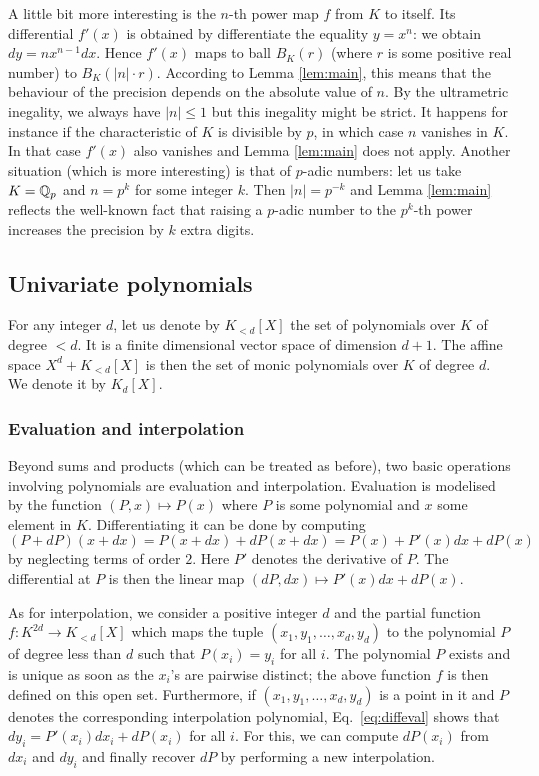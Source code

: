 \documentclass{lms}
\begin{document}
A little bit more interesting is the $n$-th power map $f$ from $K$ to 
itself. Its differential $f'(x)$ is obtained by differentiate the 
equality $y = x^n$: we obtain $dy = n x^{n-1} dx$.
Hence $f'(x)$ maps to ball $B_K(r)$ (where $r$ is some positive real 
number) to $B_K(|n|{\cdot} r)$. According to Lemma \ref{lem:main}, this 
means that the behaviour of the precision depends on the absolute value 
of $n$. By the ultrametric inegality, we always have $|n| \leq 1$ but 
this inegality might be strict. It happens for instance if the 
characteristic of $K$ is divisible by $p$, in which case $n$ vanishes in 
$K$. In that case $f'(x)$ also vanishes and Lemma \ref{lem:main} does 
not apply. 
Another situation (which is more interesting) is that of $p$-adic 
numbers: let us take $K = \mathbb Q_p$ and $n = p^k$ for some integer $k$. Then
$|n| = p^{-k}$ and Lemma \ref{lem:main} reflects the well-known fact that
raising a $p$-adic number to the $p^k$-th power increases the precision 
by $k$ extra digits.

\subsection{Univariate polynomials}
\label{ssec:polynomials}

For any integer $d$, let us denote by $K_{< d}[X]$ the set of 
polynomials over $K$ of degree $< d$. It is a finite dimensional vector 
space of dimension $d+1$. The affine space $X^d + K_{< d}[X]$ is then 
the set of monic polynomials over $K$ of degree $d$. We denote it by 
$K_d[X]$.

\subsubsection*{Evaluation and interpolation}

Beyond sums and products (which can be treated as before), two basic 
operations involving polynomials are evaluation and interpolation.
Evaluation is modelised by the function $(P,x) \mapsto P(x)$ where
$P$ is some polynomial and $x$ some element in $K$. Differentiating
it can be done by computing
\begin{equation}
\label{eq:diffeval}
(P + dP)(x + dx) = P(x + dx) + dP(x + dx) = P(x) + P'(x) dx + dP(x)
\end{equation}
by neglecting terms of order $2$. Here $P'$ denotes the derivative of 
$P$. The differential at $P$ is then the linear map $(dP, dx) \mapsto 
P'(x) dx + dP(x)$.

As for interpolation, we consider a positive integer $d$ and the partial 
function $f : K^{2d} \to K_{< d}[X]$ which maps the tuple $(x_1, y_1, 
\ldots, x_d, y_d)$ to the polynomial $P$ of degree less than $d$ such 
that $P(x_i) = y_i$ for all $i$. The polynomial $P$ exists and is unique 
as soon as the $x_i$'s are pairwise distinct; the above function $f$ is 
then defined on this open set. Furthermore, if $(x_1, y_1, \ldots, x_d, 
y_d)$ is a point in it and $P$ denotes the corresponding interpolation 
polynomial, Eq.~\eqref{eq:diffeval} shows that $d y_i = P'(x_i) dx_i + 
dP(x_i)$ for all $i$. For this, we can compute $dP(x_i)$ from $d x_i$ 
and $d y_i$ and finally recover $dP$ by performing a new interpolation.
\end{document}
